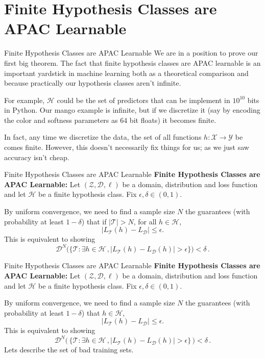 \documentclass[10pt, table, handout]{beamer}
\newcommand{\cT}{\ensuremath{\mathcal{T}}}
\newcommand{\cD}{\ensuremath{\mathcal{D}}}
\newcommand{\cH}{\ensuremath{\mathcal{H}}}
\begin{document}
\section{Finite Hypothesis Classes are APAC Learnable}


\begin{frame}[fragile]{Finite Hypothesis Classes are APAC Learnable}
We are in a position to prove our first big theorem. The fact that finite hypothesis classes are APAC learnable is an important yardstick in machine learning both as a theoretical comparison and because practically our hypothesis classes aren't infinite.\newline\pause

For example, $\mathcal{H}$ could be the set of predictors that can be implement in $10^{10}$ bits in Python. Our mango example is infinite, but if we discretize it (say by encoding the color and softness parameters as 64 bit floats) it becomes finite. \pause\newline

In fact, any time we discretize the data, the set of all functions $h:\mathcal{X}\to\mathcal{Y}$ be comes finite. However, this doesn't necessarily fix things for us; as we just saw accuracy isn't cheap.
\end{frame}



\begin{frame}[fragile]{Finite Hypothesis Classes are APAC Learnable}
\textbf{Finite Hypothesis Classes are APAC Learnable:}
Let $(\mathcal{Z},\cD,\ell)$ be a domain, distribution and loss function and let $\cH$ be a finite hypothesis class. Fix $\epsilon,\delta\in (0,1)$. \pause 

By uniform convergence, we need to find a sample size $N$ the guarantees (with probability at least $1-\delta$) that if $|\mathcal{T}|>N$, for all $h\in \mathcal{H}$, 
$$
|L_\cT(h) - L_\cD|\leq \epsilon.
$$
\pause 
This is equivalent to showing
$$
\cD^N\Big(\big\{\cT:\exists h\in \mathcal{H}\,,|L_\cT(h)-L_\cD(h)|>\epsilon\big\}\Big)<\delta\,.
$$ 
\end{frame}



\begin{frame}[fragile]{Finite Hypothesis Classes are APAC Learnable}
\textbf{Finite Hypothesis Classes are APAC Learnable:}
Let $(\mathcal{Z},\cD,\ell)$ be a domain, distribution and loss function and let $\cH$ be a finite hypothesis class. Fix $\epsilon,\delta\in (0,1)$. 

By uniform convergence, we need to find a sample size $N$ the guarantees (with probability at least $1-\delta$) that $h\in \mathcal{H}$, 
$$
|L_\cT(h) - L_\cD|\leq \epsilon.
$$
This is equivalent to showing
$$
\cD^N\Big(\,\boxed{\big\{\cT:\exists h\in \mathcal{H}\,,|L_\cT(h)-L_\cD(h)|>\epsilon\big\}}\,\Big)<\delta\,.
$$ 
Lets describe the set of bad training sets. 
\end{frame}
\end{document}
